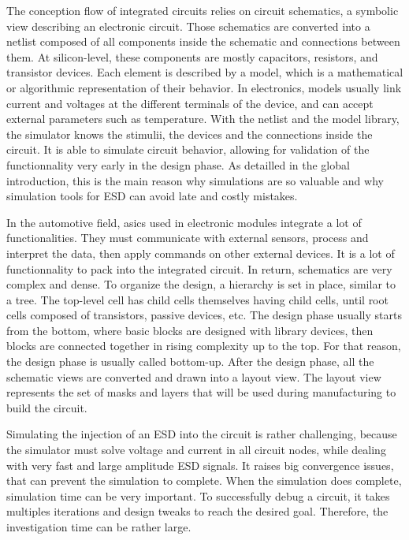 The conception flow of integrated circuits relies on circuit schematics, a symbolic view describing an electronic circuit.
Those schematics are converted into a netlist composed of all components inside the schematic and connections between them.
At silicon-level, these components are mostly capacitors, resistors, and transistor devices.
Each element is described by a model, which is a mathematical or algorithmic representation of their behavior.
In electronics, models usually link current and voltages at the different terminals of the device, and can accept external parameters such as temperature.
With the netlist and the model library, the simulator knows the stimulii, the devices and the connections inside the circuit.
It is able to simulate circuit behavior, allowing for validation of the functionnality very early in the design phase.
As detailled in the global introduction, this is the main reason why simulations are so valuable and why simulation tools for ESD can avoid late and costly mistakes.

In the automotive field, \gls{asic}s used in electronic modules integrate a lot of functionalities.
They must communicate with external sensors, process and interpret the data, then apply commands on other external devices.
It is a lot of functionnality to pack into the integrated circuit.
In return, schematics are very complex and dense.
To organize the design, a hierarchy is set in place, similar to a tree.
The top-level cell has child cells themselves having child cells, until root cells composed of transistors, passive devices, etc.
The design phase usually starts from the bottom, where basic blocks are designed with library devices, then blocks are connected together in rising complexity up to the top.
For that reason, the design phase is usually called bottom-up.
After the design phase, all the schematic views are converted and drawn into a layout view.
The layout view represents the set of masks and layers that will be used during manufacturing to build the circuit.

Simulating the injection of an ESD into the circuit is rather challenging, because the simulator must solve voltage and current in all circuit nodes, while dealing with very fast and large amplitude ESD signals.
It raises big convergence issues, that can prevent the simulation to complete.
When the simulation does complete, simulation time can be very important.
To successfully debug a circuit, it takes multiples iterations and design tweaks to reach the desired goal.
Therefore, the investigation time can be rather large.

